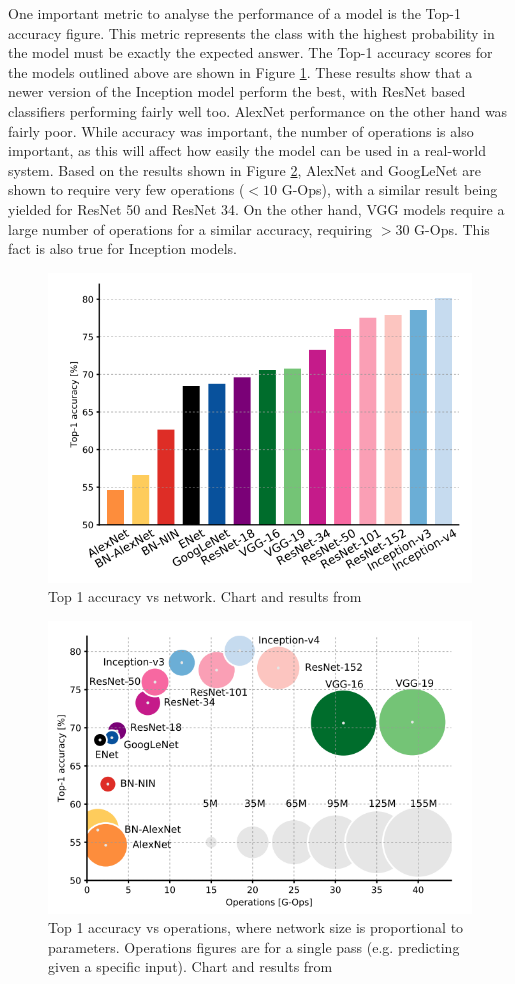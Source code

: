 \documentclass[11pt,a4paper]{article}
\begin{document}
        One important metric to analyse the performance of a model is the Top-1 accuracy figure. This metric represents the class with the highest probability in the model must be exactly the expected answer. 
        The Top-1 accuracy scores for the models outlined above are shown in Figure \ref{Top1AccuracyOverNetwork}. These results show that a newer version of the Inception model perform the best,
        with ResNet based classifiers performing fairly well too. AlexNet performance on the other hand was fairly poor. While accuracy was important, the number of operations is also important, as this will affect how easily the model can be used 
        in a real-world system. Based on the results shown in Figure \ref{Top1AccuracyOverOperations}, AlexNet and GoogLeNet are shown to require very few operations ($<10$ G-Ops),
        with a similar result being yielded for ResNet 50 and ResNet 34. On the other hand, VGG models require a large number of operations for a similar accuracy, requiring $>30$ G-Ops.
        This fact is also true for Inception models.

        \begin{figure}
            \centering
            \includegraphics[width=.7\linewidth]{Top1AccuracyOverNetwork.png}
            \caption{Top 1 accuracy vs network. Chart and results from \cite{DeepNeuralNetworkDeployability}}
            \label{Top1AccuracyOverNetwork}
        \end{figure}

        \begin{figure}
            \centering
            \includegraphics[width=.7\linewidth]{Top1AccuracyOverOperations.png}
            \caption{Top 1 accuracy vs operations, where network size is proportional to parameters. Operations figures are for a single pass (e.g. predicting given a specific input). Chart and results from \cite{DeepNeuralNetworkDeployability}}
            \label{Top1AccuracyOverOperations}
        \end{figure}
\end{document}
